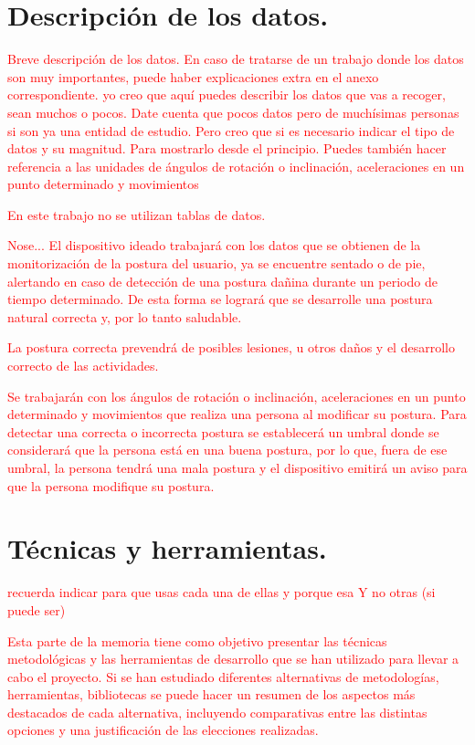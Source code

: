 
\section{Descripción de los datos.}
\textcolor{red}{
Breve descripción de los datos.
En caso de tratarse de un trabajo donde los datos son muy importantes, puede haber explicaciones extra en el anexo correspondiente. yo creo que aquí puedes describir los datos que vas a recoger, sean muchos o pocos. Date cuenta que pocos datos pero de muchísimas personas si son ya una entidad de estudio. 
Pero creo que si es necesario indicar el tipo de datos y su magnitud. Para mostrarlo desde el principio. Puedes también hacer referencia a las unidades de ángulos de rotación o inclinación, aceleraciones en un punto determinado y movimientos }

\textcolor{red}{En este trabajo no se utilizan tablas de datos.}

\textcolor{red}{Nose...}
\textcolor{red}{El dispositivo ideado trabajará con los datos que se obtienen de la monitorización de la postura del usuario, ya se encuentre sentado o de pie, alertando en caso de detección de una postura dañina durante un periodo de tiempo determinado. De esta forma se logrará que se desarrolle una postura natural correcta y, por lo tanto saludable. }

\textcolor{red}{La postura correcta prevendrá de posibles lesiones, u otros daños y el desarrollo correcto de las actividades.}

\textcolor{red}{Se trabajarán con los ángulos de rotación o inclinación, aceleraciones en un punto determinado y movimientos que realiza una persona al modificar su postura. Para detectar una correcta o incorrecta postura se establecerá un umbral donde se considerará que la persona está en una buena postura, por lo que, fuera de ese umbral, la persona tendrá una mala postura y el dispositivo emitirá un aviso para que la persona modifique su postura.}
 
\section{Técnicas y herramientas.}

\textcolor{red}{recuerda indicar para que usas cada una de ellas y porque esa Y no otras (si puede ser)}

\textcolor{red}{Esta parte de la memoria tiene como objetivo presentar las técnicas metodológicas y las herramientas de desarrollo que se han utilizado para llevar a cabo el proyecto. Si se han estudiado diferentes alternativas de metodologías, herramientas, bibliotecas se puede hacer un resumen de los aspectos más destacados de cada alternativa, incluyendo comparativas entre las distintas opciones y una justificación de las elecciones realizadas. }

